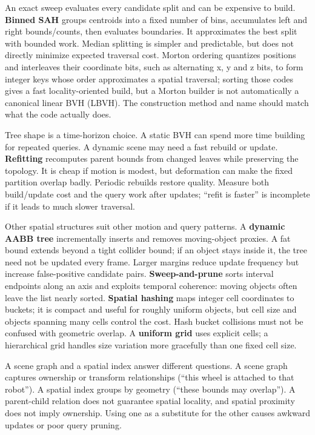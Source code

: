 An exact sweep evaluates every candidate split and can be expensive to build. \textbf{Binned SAH} groups centroids into a fixed number of bins, accumulates left and right bounds/counts, then evaluates boundaries. It approximates the best split with bounded work. Median splitting is simpler and predictable, but does not directly minimize expected traversal cost. Morton ordering quantizes positions and interleaves their coordinate bits, such as alternating x, y and z bits, to form integer keys whose order approximates a spatial traversal; sorting those codes gives a fast locality-oriented build, but a Morton builder is not automatically a canonical linear BVH (LBVH). The construction method and name should match what the code actually does.

Tree shape is a time-horizon choice. A static BVH can spend more time building for repeated queries. A dynamic scene may need a fast rebuild or update. \textbf{Refitting} recomputes parent bounds from changed leaves while preserving the topology. It is cheap if motion is modest, but deformation can make the fixed partition overlap badly. Periodic rebuilds restore quality. Measure both build/update cost and the query work after updates; ``refit is faster'' is incomplete if it leads to much slower traversal.

Other spatial structures suit other motion and query patterns. A \textbf{dynamic AABB tree} incrementally inserts and removes moving-object proxies. A fat bound extends beyond a tight collider bound; if an object stays inside it, the tree need not be updated every frame. Larger margins reduce update frequency but increase false-positive candidate pairs. \textbf{Sweep-and-prune} sorts interval endpoints along an axis and exploits temporal coherence: moving objects often leave the list nearly sorted. \textbf{Spatial hashing} maps integer cell coordinates to buckets; it is compact and useful for roughly uniform objects, but cell size and objects spanning many cells control the cost. Hash bucket collisions must not be confused with geometric overlap. A \textbf{uniform grid} uses explicit cells; a hierarchical grid handles size variation more gracefully than one fixed cell size.

A scene graph and a spatial index answer different questions. A scene graph captures ownership or transform relationships (``this wheel is attached to that robot''). A spatial index groups by geometry (``these bounds may overlap''). A parent-child relation does not guarantee spatial locality, and spatial proximity does not imply ownership. Using one as a substitute for the other causes awkward updates or poor query pruning.

